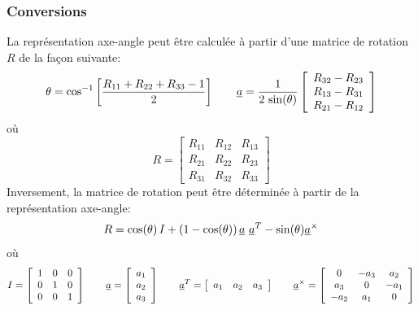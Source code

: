 \subsubsection{Conversions}
La représentation axe-angle peut être calculée à partir d'une matrice de rotation $R$ de la façon suivante:
\begin{equation}
	\theta=\cos^{-1}\left[\frac{R_{11}+R_{22}+R_{33}-1}{2}\right]
	\quad\quad
	\underline{a}=\frac{1}{2 \, \sin(\theta)}\left[ \begin{array}{c}
												 R_{32}-R_{23}  \\
												 R_{13}-R_{31} \\
												 R_{21}-R_{12} \end{array}
		\right]
\end{equation}
où
\begin{equation}
	R =\left[ \begin{array}{ccc}
				  R_{11} & R_{12} & R_{13} \\
				  R_{21} & R_{22} & R_{23} \\
				  R_{31} & R_{32} & R_{33} \end{array}
		\right]
\end{equation}
Inversement, la matrice de rotation peut être déterminée à partir de la représentation axe-angle:
\begin{equation}
	R=\cos(\theta) \, I + (1-\cos(\theta) ) \, \col{a}\ \col{a}^T-\sin(\theta)\col{a}^{\times}
\end{equation}
où
\begin{equation}
	I =\left[ \begin{array}{ccc}
				  1 & 0 & 0 \\
				  0 & 1 & 0 \\
				  0 & 0 & 1      \end{array}
		\right] \quad\quad
	\underline{a}=\left[ \begin{array}{c}
					   a_{1}  \\
					   a_{2}  \\
					   a_{3} \end{array}
		\right]
	\quad\quad
	\underline{a}^T=\left[ \begin{array}{ccc} a_{1} & a_{2} & a_{3} \end{array} \right]
	\quad\quad
	\underline{a}^{\times} =\left[ \begin{array}{ccc}
								 0      & -a_{3} &  a_{2} \\
								 a_{3} & 0      & -a_{1} \\
								 -a_{2} &  a_{1} & 0      \end{array}
		\right]
\end{equation}


